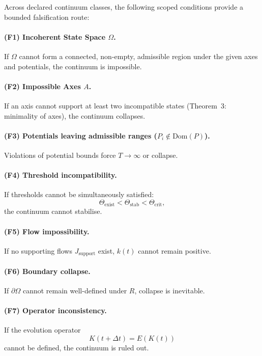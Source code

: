 Across declared continuum classes, the following scoped conditions provide
a bounded falsification route:

\paragraph{(F1) Incoherent State Space \texorpdfstring{$\Omega$}{\Omega}.}
If $\Omega$ cannot form a connected, non-empty, admissible region under
the given axes and potentials, the continuum is impossible.

\paragraph{(F2) Impossible Axes \texorpdfstring{$A$}{A}.}
If an axis cannot support at least two incompatible states
(Theorem~3: minimality of axes), the continuum collapses.

\paragraph{(F3) Potentials leaving admissible ranges ($P_i \notin \mathrm{Dom}(P)$).}
Violations of potential bounds force $T \to \infty$ or collapse.

\paragraph{(F4) Threshold incompatibility.}
If thresholds cannot be simultaneously satisfied:
\[
\Theta_{\mathrm{exist}} < \Theta_{\mathrm{stab}} < \Theta_{\mathrm{crit}},
\]
the continuum cannot stabilise.

\paragraph{(F5) Flow impossibility.}
If no supporting flows $J_{\mathrm{support}}$ exist, $k(t)$ cannot
remain positive.

\paragraph{(F6) Boundary collapse.}
If $\partial\Omega$ cannot remain well-defined under $R$,
collapse is inevitable.

\paragraph{(F7) Operator inconsistency.}
If the evolution operator
\[
K(t+\Delta t) = E(K(t))
\]
cannot be defined, the continuum is ruled out.

